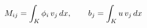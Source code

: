 \documentclass[preview]{standalone}
\begin{document}
\begin{align*}
\special{dvisvgm:raw <g id='unique000'>}M_{ij} = \int_K \phi_i\, v_j\, dx, \qquad b_j = \int_K u\, v_j\, dx\special{dvisvgm:raw </g>}
\end{align*}
\end{document}
